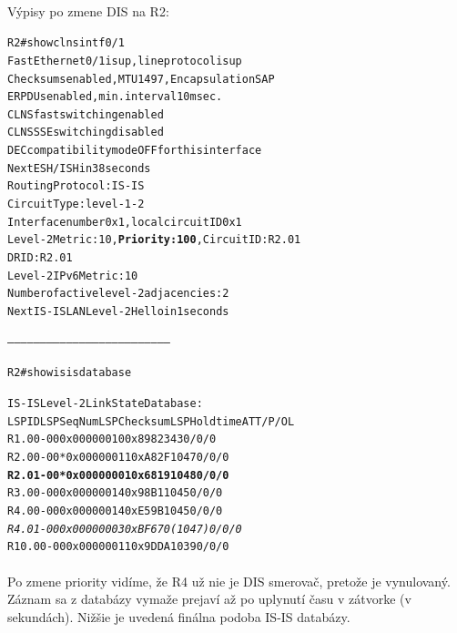 \documentclass[12pt,twoside,a4paper]{report}
\begin{document}
\paragraph{}
Výpisy po zmene DIS na R2:

\noindent
{\selectfont
\begin{small}
\begin{alltt}

R2#show clns int f0/1
FastEthernet0/1 is up, line protocol is up
  Checksums enabled, MTU 1497, Encapsulation SAP
  ERPDUs enabled, min. interval 10 msec.
  CLNS fast switching enabled
  CLNS SSE switching disabled
  DEC compatibility mode OFF for this interface
  Next ESH/ISH in 38 seconds
  Routing Protocol: IS-IS
    Circuit Type: level-1-2
    Interface number 0x1, local circuit ID 0x1
    Level-2 Metric: 10, \textbf{Priority: 100}, Circuit ID: R2.01
    DR ID: R2.01
    Level-2 IPv6 Metric: 10
    Number of active level-2 adjacencies: 2
    Next IS-IS LAN Level-2 Hello in 1 seconds


--------------------------------------------------------------------------


R2#show isis database

IS-IS Level-2 Link State Database:
LSPID                 LSP Seq Num  LSP Checksum  LSP Holdtime      ATT/P/OL
R1.00-00              0x00000010   0x8982        343               0/0/0
R2.00-00            * 0x00000011   0xA82F        1047              0/0/0
\textbf{R2.01-00            * 0x00000001   0x6819        1048              0/0/0}
R3.00-00              0x00000014   0x98B1        1045              0/0/0
R4.00-00              0x00000014   0xE59B        1045              0/0/0
\textit{R4.01-00              0x00000003   0xBF67        0 (1047)          0/0/0}
R10.00-00             0x00000011   0x9DDA        1039              0/0/0
\end{alltt}
\end{small}
}

\paragraph{}
Po zmene priority vidíme, že R4 už nie je DIS smerovač, pretože  je vynulovaný. Záznam sa z databázy vymaže prejaví až po uplynutí času v zátvorke (v sekundách). Nižšie je uvedená finálna podoba IS-IS databázy.
\end{document}
